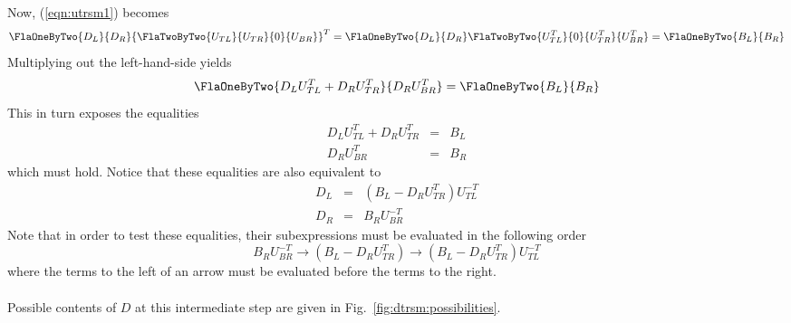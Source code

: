 Now, (\ref{eqn:utrsm1}) becomes
\[
\FlaOneByTwo{ D_{L} }
            { D_{R} }
{\FlaTwoByTwo{ U_{TL} }{ U_{TR} }
             {     0  }{ U_{BR} }}^{T}
=
\FlaOneByTwo{ D_{L} }
            { D_{R} }
\FlaTwoByTwo{ U_{TL}^{T} }{     0      }
            { U_{TR}^{T} }{ U_{BR}^{T} }
=
\FlaOneByTwo{ B_{L} }
            { B_{R} }
\]
Multiplying out the left-hand-side yields
\[
\FlaOneByTwo{ D_{L} U_{TL}^{T} + D_{R} U_{TR}^{T} }
            { D_{R} U_{BR}^{T}  }
=
\FlaOneByTwo{ B_{L} }
            { B_{R} }
\]
This in turn exposes the equalities
\begin{eqnarray*}
D_{L} U_{TL}^{T} + D_{R} U_{TR}^{T} &=& B_{L} \\
D_{R} U_{BR}^{T}                    &=& B_{R}
\end{eqnarray*}
which must hold.
Notice that these equalities are also 
equivalent to
\begin{eqnarray*}
D_{L}  &=& ( B_{L} - D_{R} U_{TR}^{T} ) U_{TL}^{-T} \\
D_{R}  &=&   B_{R} U_{BR}^{-T}
\end{eqnarray*}
Note that in order to test these equalities, their subexpressions must be evaluated in the following order \\
\[
B_{R} U_{BR}^{-T}
\rightarrow 
(B_{L} - D_{R} U_{TR}^{T}) 
\rightarrow 
(B_{L} - D_{R} U_{TR}^{T}) U_{TL}^{-T}
\]
where the terms to the left of an arrow must be evaluated before the terms to the right.\\ \\
Possible contents of $ D $
at this intermediate step are given
in Fig.~\ref{fig:dtrsm:possibilities}.
